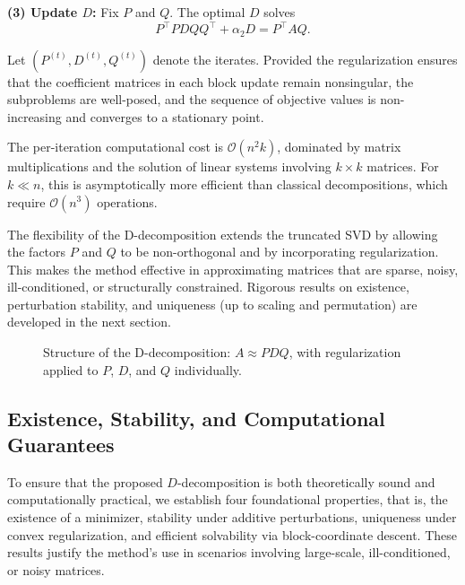 \documentclass[10pt,a4paper]{article}
\begin{document}
\textbf{(3) Update \( D \):} Fix \( P \) and \( Q \). The optimal \( D \) solves
\[
P^\top P D Q Q^\top + \alpha_2 D = P^\top A Q.
\]

Let \( (P^{(t)}, D^{(t)}, Q^{(t)}) \) denote the iterates. Provided the regularization ensures that the coefficient matrices in each block update remain nonsingular, the subproblems are well-posed, and the sequence of objective values is non-increasing and converges to a stationary point.

The per-iteration computational cost is \( \mathcal{O}(n^2 k) \), dominated by matrix multiplications and the solution of linear systems involving \( k \times k \) matrices. For \( k \ll n \), this is asymptotically more efficient than classical decompositions, which require \( \mathcal{O}(n^3) \) operations.

The flexibility of the D-decomposition extends the truncated SVD by allowing the factors \( P \) and \( Q \) to be non-orthogonal and by incorporating regularization. This makes the method effective in approximating matrices that are sparse, noisy, ill-conditioned, or structurally constrained. Rigorous results on existence, perturbation stability, and uniqueness (up to scaling and permutation) are developed in the next section.

\begin{figure}[H]
\centering
{}
\caption{Structure of the D-decomposition: $A \approx PDQ$, with regularization applied to $P$, $D$, and $Q$ individually.}
\end{figure}


\subsection{Existence, Stability, and Computational Guarantees}

To ensure that the proposed $D$-decomposition is both theoretically sound and computationally practical, we establish four foundational properties, that is, the existence of a minimizer, stability under additive perturbations, uniqueness under convex regularization, and efficient solvability via block-coordinate descent. These results justify the method's use in scenarios involving large-scale, ill-conditioned, or noisy matrices.
\end{document}
